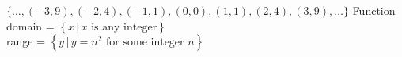 {$ \{\ldots, (-3, 9), (-2, 4), (-1, 1), (0, 0), (1, 1), (2, 4), (3, 9),  \ldots\}$}
{Function \\ domain = $\left\{x \, | \, \text{$x$ is any integer}\right\}$ \\ range = $\left\{y \, | \, \text{$y = n^{2}$ for some integer $n$}\right\}$ }
